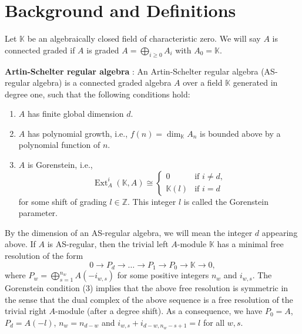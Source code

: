 \documentclass{amsart}
\DeclareMathOperator{\Ext}{Ext}
\begin{document}
\section{Background and Definitions}
Let $\mathbb{K}$ be an algebraically closed field of characteristic zero.
We will say $A$ is connected graded if $A$ is graded $A = \bigoplus_{i \geq 0} A_i$ with $A_0=\mathbb{K}.$
\begin{definition}
\textbf{Artin-Schelter regular algebra} \cite{ARTIN1987171}:
 An Artin-Schelter regular algebra (AS-regular algebra) is a connected graded algebra $A$ over a field $\mathbb{K}$ generated
in degree one, such that the following conditions hold:
\begin{enumerate}
    \item $A$ has finite global dimension $d$.
    \item \textnormal{\( A \) has polynomial growth, i.e., \( f(n) = \dim_\mathbb{K} A_n \) is bounded above by a polynomial function of \( n \).}
    \item \( A \) is Gorenstein, i.e.,
\[
\Ext^{i}_{A}(\mathbb{K}, A) \cong 
\begin{cases} 
0 & \text{if } i \neq d, \\ 
 \mathbb{K}(l) & \text{if } i = d 
\end{cases}
\]
for some shift of grading \( l \in \mathbb{Z} \). This integer \( l \) is called the Gorenstein parameter.
\end{enumerate}
\end{definition}

By the dimension of an AS-regular algebra, we will mean the integer $d$ appearing above. If $A$ is AS-regular, then the trivial left $A$-module $\mathbb{K}$ has a minimal free resolution of the form
\[ 0 \rightarrow P_d \rightarrow \dots \rightarrow P_1 \rightarrow P_0 \rightarrow \mathbb{K} \rightarrow 0, \]
where $P_w = \bigoplus_{s=1}^{n_w} A(-i_{w,s})$ for some positive integers $n_w$ and $i_{w,s}$. The Gorenstein condition (3) implies that the above free resolution is symmetric in the sense that the dual complex of the above sequence is a free resolution of the trivial right $A$-module (after a degree shift). As a consequence, we have $P_0 = A$, $P_d = A(-l)$, $n_w = n_{d-w}$ and $i_{w,s} + i_{d-w,n_w-s+1} = l$ for all $w, s$.
\end{document}
